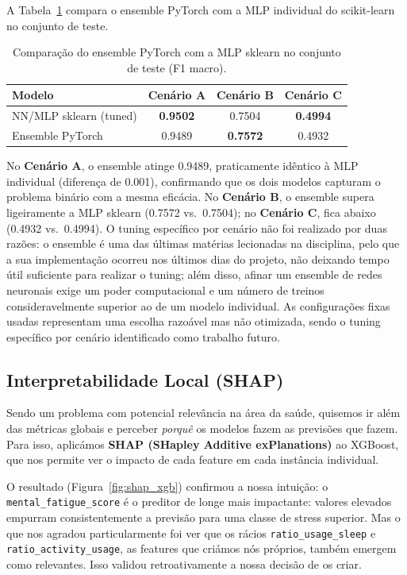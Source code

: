 \documentclass[12pt,a4paper]{article}
\begin{document}
A Tabela~\ref{tab:ensemble_results} compara o ensemble PyTorch com a MLP individual do
scikit-learn no conjunto de teste.

\begin{table}[H]
\centering
\caption{Comparação do ensemble PyTorch com a MLP sklearn no conjunto de teste (F1 macro).}
\label{tab:ensemble_results}
\begin{tabular}{lccc}
\toprule
\textbf{Modelo} & \textbf{Cenário A} & \textbf{Cenário B} & \textbf{Cenário C} \\
\midrule
NN/MLP sklearn (tuned) & \textbf{0.9502} & 0.7504          & \textbf{0.4994} \\
Ensemble PyTorch       & 0.9489          & \textbf{0.7572} & 0.4932          \\
\bottomrule
\end{tabular}
\end{table}

No \textbf{Cenário A}, o ensemble atinge 0.9489, praticamente idêntico à MLP individual
(diferença de 0.001), confirmando que os dois modelos capturam o problema binário com
a mesma eficácia. No \textbf{Cenário B}, o ensemble supera ligeiramente a MLP sklearn
(0.7572 vs.\ 0.7504); no \textbf{Cenário C}, fica abaixo (0.4932 vs.\ 0.4994). O tuning
específico por cenário não foi realizado por duas razões: o ensemble é uma das últimas
matérias lecionadas na disciplina, pelo que a sua implementação ocorreu nos últimos dias
do projeto, não deixando tempo útil suficiente para realizar o tuning; além disso,
afinar um ensemble de redes neuronais exige um poder computacional e um número de
treinos consideravelmente superior ao de um modelo individual. As configurações fixas
usadas representam uma escolha razoável mas não otimizada, sendo o tuning específico
por cenário identificado como trabalho futuro.

\subsection{Interpretabilidade Local (SHAP)}

Sendo um problema com potencial relevância na área da saúde, quisemos ir além das métricas
globais e perceber \textit{porquê} os modelos fazem as previsões que fazem. Para isso,
aplicámos \textbf{SHAP (SHapley Additive exPlanations)} ao XGBoost, que nos permite ver
o impacto de cada feature em cada instância individual.

O resultado (Figura~\ref{fig:shap_xgb}) confirmou a nossa intuição: o
\texttt{mental\_fatigue\_score} é o preditor de longe mais impactante: valores elevados
empurram consistentemente a previsão para uma classe de stress superior. Mas o que nos
agradou particularmente foi ver que os rácios \texttt{ratio\_usage\_sleep} e
\texttt{ratio\_activity\_usage}, as features que criámos nós próprios, também emergem
como relevantes. Isso validou retroativamente a nossa decisão de os criar.
\end{document}
